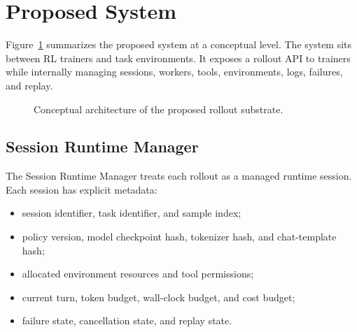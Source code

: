 \documentclass[11pt]{article}
\begin{document}
\section{Proposed System}

Figure~\ref{fig:architecture} summarizes the proposed system at a conceptual level.
The system sits between RL trainers and task environments.
It exposes a rollout API to trainers while internally managing sessions, workers, tools, environments, logs, failures, and replay.

\begin{figure}[t]
\centering
{}
\caption{Conceptual architecture of the proposed rollout substrate.}
\label{fig:architecture}
\end{figure}

\subsection{Session Runtime Manager}

The Session Runtime Manager treats each rollout as a managed runtime session.
Each session has explicit metadata:

\begin{itemize}[leftmargin=*]
    \item session identifier, task identifier, and sample index;
    \item policy version, model checkpoint hash, tokenizer hash, and chat-template hash;
    \item allocated environment resources and tool permissions;
    \item current turn, token budget, wall-clock budget, and cost budget;
    \item failure state, cancellation state, and replay state.
\end{itemize}
\end{document}
